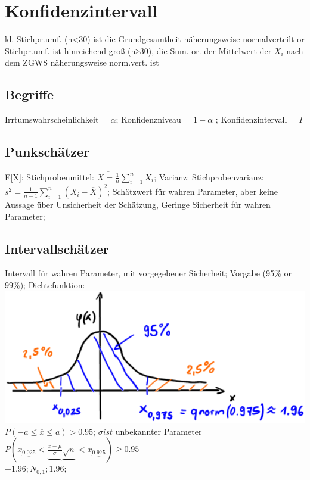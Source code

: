 \section{Konfidenzintervall}
kl. Stichpr.umf. (n<30) ist die Grundgesamtheit näherungsweise normalverteilt or Stichpr.umf. ist hinreichend groß (n≥30), die Sum. or. der Mittelwert der $ X_i $ nach dem ZGWS näherungsweise norm.vert. ist
  \subsection{Begriffe}
   Irrtumswahrscheinlichkeit = $ \alpha $; 
  Konfidenzniveau =  $ 1-\alpha $ ; 
  Konfidenzintervall = $ I $
  \subsection{Punkschätzer}
  E[X]: Stichprobenmittel:
  $ \overline{X = \frac{1}{n}} \sum_{i=1}^{n} X_{i}$; 
  Varianz: Stichprobenvarianz:
  $ s^{2} = \frac{1}{n -1} \sum_{i=1}^{n} (X_{i} - \overline{X})^{2} $; 
  Schätzwert für wahren Parameter, aber keine Aussage über Unsicherheit der Schätzung, Geringe Sicherheit für wahren Parameter; 
  
  \subsection{Intervallschätzer}
  Intervall für wahren Parameter, mit vorgegebener Sicherheit; Vorgabe (95\% or 99\%); 
  Dichtefunktion:
  \includegraphics[scale=0.25]{./pic/KonfidenzintervallDichtefunktion.png}
  $ P(-a \le \overline{x} \le a) > 0.95 $; 
  $ \sigma ist $ unbekannter Parameter\\
  $ P( x_{\underbrace{0.025}} < \underbrace{ \frac{\overline{x} - \mu}{\sigma}\sqrt{n} } < x_{\underbrace{0.975}} ) \ge 0.95 $\\
  $ -1.96; N_{0,1}; 1.96 $; 
  
